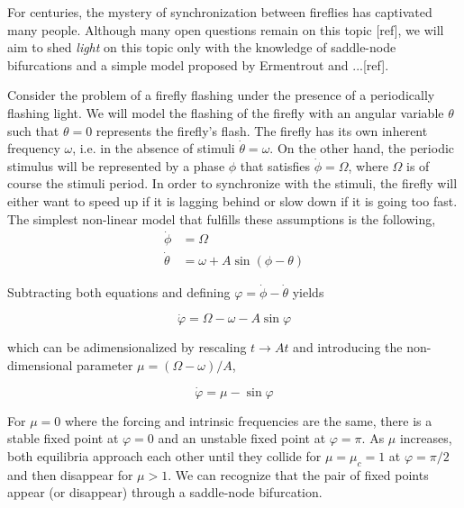 \begin{exmp}
    For centuries, the mystery of synchronization between fireflies has
    captivated many people. Although many open questions remain on this topic [ref],
    we will aim to shed {\em light} on this topic only with the knowledge of saddle-node bifurcations
    and a simple model proposed by Ermentrout and ...[ref]. 
    
    Consider the problem
    of a firefly flashing under the presence of a periodically flashing light.
    We will model the flashing of the firefly with an angular variable $\theta$
    such that $\theta = 0$ represents the firefly's flash. The firefly has its 
    own inherent frequency $\omega$, i.e. in the absence of stimuli 
    $\dot{\theta} = \omega$. On the other hand, the periodic stimulus will be
    represented by a phase $\phi$ that satisfies $\dot{\phi} = \Omega$, where 
    $\Omega$ is of course the stimuli period. In order to synchronize with the
    stimuli, the firefly will either want to speed up if it is lagging behind
    or slow down if it is going too fast. The simplest non-linear model that
    fulfills these assumptions is the following,
    \begin{align*}
        \dot{\phi} &= \Omega \\
        \dot{\theta} &= \omega + A \sin(\phi -  \theta)
    \end{align*}

    Subtracting both equations and defining $\varphi = \dot{\phi} - \dot{\theta}$
    yields 

    \begin{equation*}
        \dot{\varphi} = \Omega - \omega - A \sin \varphi
    \end{equation*}

    which can be adimensionalized by rescaling $t \to At$ and introducing
    the non-dimensional parameter $\mu = (\Omega - \omega)/A$,

    \begin{equation}
        \dot{\varphi} = \mu - \sin \varphi
        \label{eq:pre_bif_sn_exmp}
    \end{equation}

    For $\mu = 0$ where the forcing and intrinsic frequencies are the same, there
    is a stable fixed point at $\varphi = 0$ and an unstable fixed point at $\varphi = \pi$.
    As $\mu$ increases, both equilibria approach each other until they collide for $\mu=\mu_c=1$
    at $\varphi = \pi/2$
    and then disappear for $\mu > 1$. We can recognize that the pair of fixed
    points appear (or disappear) through a saddle-node bifurcation.
    

\end{exmp}
